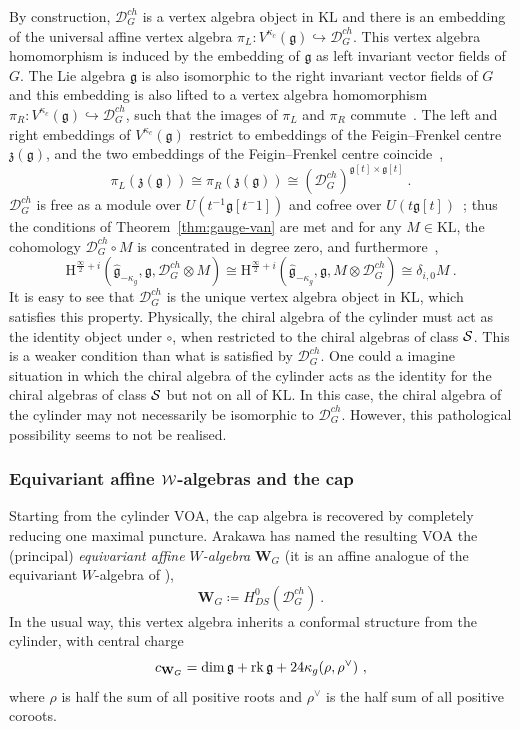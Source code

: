 \documentclass[a4paper]{article}
\def\SS{{\cal S}}
\def\WW{{\cal W}}
\def\dim{{\rm dim}}
\def\gf{\mathfrak{g}}
\def \KL{\mathrm{KL}}
\newcommand{\Hi}[1]{\mathrm{H}^{\frac{\infty}{2}+#1}}
\def\D{\mathcal{D}^{ch}}
\def\W{\mathbf{W}}
\begin{document}
By construction, $\D_G$ is a vertex algebra object in $\KL$ and there is an embedding of the universal affine vertex algebra $\pi_L:V^{\kappa_c}(\gf)\hookrightarrow\D_G$. This vertex algebra homomorphism is induced by the embedding of $\gf$ as left invariant vector fields of $G$. The Lie algebra $\gf$ is also isomorphic to the right invariant vector fields of $G$ and this embedding is also lifted to a vertex algebra homomorphism $\pi_R:V^{\kappa_c}(\gf)\hookrightarrow \D_G$, such that the images of $\pi_L$ and $\pi_R$ commute~\cite{Gorbounov:2001}. The left and right embeddings of $V^{\kappa_c}(\gf)$ restrict to embeddings of the Feigin--Frenkel centre $\mathfrak{z}(\gf)$, and the two embeddings of the Feigin--Frenkel centre coincide~\cite{frenkel2004},
\begin{equation}
	\pi_L(\mathfrak{z}(\gf))\cong\pi_R(\mathfrak{z}(\gf)) \cong (\D_G)^{\gf[t]\times\gf[t]}~.
\end{equation}
$\D_G$ is free as a module over $U(t^{-1}\gf[t^-1])$ and cofree over $U(t\gf[t])$~\cite{Arakawa:2018egx}; thus the conditions of Theorem~\ref{thm:gauge-van} are met and for any $M\in \KL$, the cohomology $\D_G\circ M$ is concentrated in degree zero, and furthermore~\cite{Arakawa:2018egx},
\begin{equation}
	\Hi{i}(\hat{\gf}_{-\kappa_g},\gf,\D_G\otimes M) \cong \Hi{i}(\hat{\gf}_{-\kappa_g},\gf, M\otimes\D_G) \cong \delta_{i,0}M~.
\end{equation}
It is easy to see that $\D_G$ is the unique vertex algebra object in $\KL$, which satisfies this property. Physically, the chiral algebra of the cylinder must act as the identity object under $\circ$, when restricted to the chiral algebras of class $\SS$. This is a weaker condition than what is satisfied by $\D_G$. One could a imagine situation in which the chiral algebra of the cylinder acts as the identity for the chiral algebras of class $\SS$ but not on all of $\KL$. In this case, the chiral algebra of the cylinder may not necessarily be isomorphic to $\D_G$. However, this pathological possibility seems to not be realised.

\subsubsection*{Equivariant affine $\WW$-algebras and the cap}

Starting from the cylinder VOA, the cap algebra is recovered by completely reducing one maximal puncture. Arakawa has named the resulting VOA the (principal) \emph{equivariant affine $W$-algebra} $\W_G$ (it is an affine analogue of the equivariant $W$-algebra of \cite{Losev:2007Qua}),
\begin{equation}\label{eq:defcap}
	\W_G \coloneqq H^{0}_{DS}(\D_G)~.
\end{equation}
In the usual way, this vertex algebra inherits a conformal structure from the cylinder, with central charge
\begin{equation}
	c_{\W_G} = \dim\,\gf +\mathrm{rk}\,\gf+ 24 \kappa_g(\rho,\rho^\vee)~,
\end{equation}
where $\rho$ is half the sum of all positive roots and $\rho^\vee$ is the half sum of all positive coroots.
\end{document}
